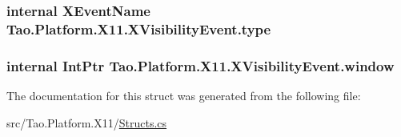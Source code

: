 \label{struct_tao_1_1_platform_1_1_x11_1_1_x_visibility_event_a7e9bffd2bc39421bd7e085e019ae74ca}
\hypertarget{struct_tao_1_1_platform_1_1_x11_1_1_x_visibility_event_a913a9a41138e2b83156f13307fa0c7a5}{
\subsubsection[{type}]{\setlength{\rightskip}{0pt plus 5cm}internal {\bf XEventName} {\bf Tao.Platform.X11.XVisibilityEvent.type}}}
\label{struct_tao_1_1_platform_1_1_x11_1_1_x_visibility_event_a913a9a41138e2b83156f13307fa0c7a5}
\hypertarget{struct_tao_1_1_platform_1_1_x11_1_1_x_visibility_event_ae261d631e7de6c8a886e3f8fedbe8e95}{
\subsubsection[{window}]{\setlength{\rightskip}{0pt plus 5cm}internal IntPtr {\bf Tao.Platform.X11.XVisibilityEvent.window}}}
\label{struct_tao_1_1_platform_1_1_x11_1_1_x_visibility_event_ae261d631e7de6c8a886e3f8fedbe8e95}


The documentation for this struct was generated from the following file:\begin{DoxyCompactItemize}
\item 
src/Tao.Platform.X11/\hyperlink{_structs_8cs}{Structs.cs}\end{DoxyCompactItemize}
